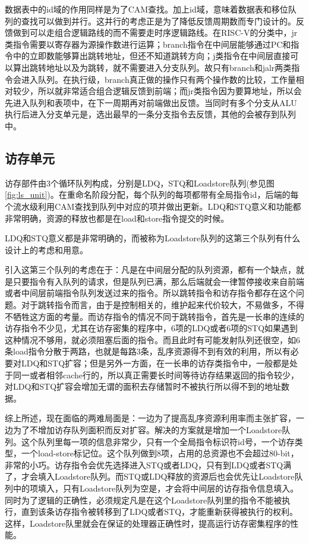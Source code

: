 数据表中的id域的作用同样是为了CAM查找。加上id域，意味着数据表和移位队列的查找可以做到并行。这并行的考虑正是为了降低反馈周期数而专门设计的。反馈做到可以走组合逻辑路线的而不需要走时序逻辑路线。在RISC-V的分类中，jr类指令需要以寄存器为源操作数进行运算；branch指令在中间层能够通过PC和指令中的立即数能够算出跳转地址，但还不知道跳转方向；j类指令在中间层直接可以算出跳转地址以及为跳转，就不需要进入分支队列。故只有branch和jalr两类指令会进入队列。在执行级，branch真正做的操作只有两个操作数的比较，工作量相对较少，所以就非常适合组合逻辑反馈到前端；而jr类指令因为要算地址，所以会先进入队列和表项中，在下一周期再对前端做出反馈。当同时有多个分支从ALU执行后进入分支单元是，选出最早的一条分支指令去反馈，其他的会被存到队列中。

\subsection{访存单元}\label{subsec:ls_unit}

访存部件由3个循环队列构成，分别是LDQ，STQ和Loadstore队列(参见图\ref{fig:ls_unit})。在重命名阶段分配，每个队列的每项都带有全局指令id，后端的每个流水级利用CAM查找到队列中对应的项并做出更新。LDQ和STQ意义和功能都非常明确，资源的释放也都是在load和store指令提交的时候。

LDQ和STQ意义都是非常明确的，而被称为Loadstore队列的这第三个队列有什么设计上的考虑和用意。

引入这第三个队列的考虑在于：凡是在中间层分配的队列资源，都有一个缺点，就是只要指令有入队列的请求，但是队列已满，那么后端就会一律暂停接收来自前端或者中间层前端指令队列发送过来的指令。所以跳转指令和访存指令都存在这个问题。对于跳转指令而言，由于是控制相关的，维护起来代价较大，不易做多，不得不牺牲这方面的考量。而访存指令的情况不同于跳转指令，首先是一长串的连续的访存指令不少见，尤其在访存密集的程序中，6项的LDQ或者6项的STQ如果遇到这种情况不够用，就必须阻塞后面的指令。而且此时有可能发射队列还很空，如6条load指令分散于两路，也就是每路3条，乱序资源得不到有效的利用，所以有必要对LDQ和STQ扩容；但是另外一方面，在一长串的访存类指令中，一般都是处于同一或者相邻cache行的，所以真正需要长时间等待访存结果返回的指令较少，对LDQ和STQ扩容会增加无谓的面积去存储暂时不被执行所以得不到的地址数据。

综上所述，现在面临的两难局面是：一边为了提高乱序资源利用率而主张扩容，一边为了不增加访存队列面积而反对扩容。解决的方案就是增加一个Loadstore队列。这个队列里每一项的信息非常少，只有一个全局指令标识符id号，一个访存类型，一个load-store标记位。这个队列做到8项，占用的总资源也不会超过80-bit，非常的小巧。访存指令会优先选择进入STQ或者LDQ，只有到LDQ或者STQ满了，才会填入Loadstore队列。而STQ或LDQ释放的资源后也会优先让Loadstore队列中的项填入，只有Loadstore队列为空是，才会将中间层的访存指令信息填入。同时为了逻辑的正确性，必须规定凡是在这个Loadstore队列里的指令不能被执行，直到该条访存指令被转移到了LDQ或者STQ，才能重新获得被执行的权利。这样，Loadstore队里就会在保证的处理器正确性时，提高运行访存密集程序的性能。

